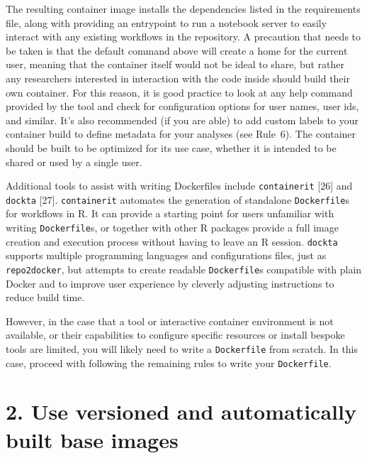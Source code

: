 \documentclass[10pt,letterpaper]{article}
\begin{document}
The resulting container image installs the dependencies listed in the
requirements file, along with providing an entrypoint to run a notebook
server to easily interact with any existing workflows in the repository.
A precaution that needs to be taken is that the default command above
will create a home for the current user, meaning that the container
itself would not be ideal to share, but rather any researchers
interested in interaction with the code inside should build their own
container. For this reason, it is good practice to look at any help
command provided by the tool and check for configuration options for
user names, user ids, and similar. It's also recommended (if you are
able) to add custom labels to your container build to define metadata
for your analyses (see Rule~6). The container should be built to be
optimized for its use case, whether it is intended to be shared or used
by a single user.

Additional tools to assist with writing Dockerfiles include
\texttt{containerit} {[}26{]} and \texttt{dockta} {[}27{]}.
\texttt{containerit} automates the generation of standalone
\texttt{Dockerfile}s for workflows in R. It can provide a starting point
for users unfamiliar with writing \texttt{Dockerfile}s, or together with
other R packages provide a full image creation and execution process
without having to leave an R session. \texttt{dockta} supports multiple
programming languages and configurations files, just as
\texttt{repo2docker}, but attempts to create readable
\texttt{Dockerfile}s compatible with plain Docker and to improve user
experience by cleverly adjusting instructions to reduce build time.

However, in the case that a tool or interactive container environment is
not available, or their capabilities to configure specific resources or
install bespoke tools are limited, you will likely need to write a
\texttt{Dockerfile} from scratch. In this case, proceed with following
the remaining rules to write your \texttt{Dockerfile}.

\hypertarget{use-versioned-and-automatically-built-base-images}{%
\section*{2. Use versioned and automatically built base
images}\label{use-versioned-and-automatically-built-base-images}}
\end{document}
